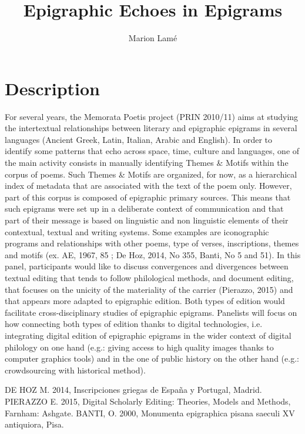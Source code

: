 \documentclass[amsthm,ebook]{saparticle}
\title{Epigraphic Echoes in Epigrams}
\author[CLUJ]{Marion Lam\'e\corref{first}}
\begin{document}
\maketitle



\section{Description}

For several years, the Memorata Poetis project (PRIN 2010/11) aims at studying the intertextual relationships between literary and epigraphic epigrams in several languages (Ancient Greek, Latin, Italian, Arabic and English). In order to identify some patterns that echo across space, time, culture and languages, one of the main activity consists in manually identifying Themes \& Motifs within the corpus of poems. Such Themes \& Motifs are organized, for now, as a hierarchical index of metadata that are associated with the text of the poem only. However, part of this corpus is composed of epigraphic primary sources. This means that such epigrams were set up in a deliberate context of communication and that part of their message is based on linguistic and non linguistic elements of their contextual, textual and writing systems. Some examples are iconographic programs and relationships with other poems, type of verses, inscriptions, themes and motifs (ex. AE, 1967, 85 ; De Hoz, 2014, No 355, Banti, No 5 and 51). In this panel, participants would like to discuss convergences and divergences between textual editing that tends to follow philological methods, and document editing, that focuses on the unicity of the materiality of the carrier (Pierazzo, 2015) and that appears more adapted to epigraphic edition. Both types of edition would facilitate cross-disciplinary studies of epigraphic epigrams. Panelists will focus on how connecting both types of edition thanks to digital technologies, i.e. integrating digital edition of epigraphic epigrams in the wider context of digital philology on one hand (e.g.: giving access to high quality images thanks to computer graphics tools) and in the one of public history on the other hand (e.g.: crowdsourcing with historical method).

DE HOZ M. 2014, Inscripciones griegas de España y Portugal, Madrid. 
PIERAZZO E. 2015, Digital Scholarly Editing: Theories, Models and Methods, Farnham: Ashgate.
BANTI, O. 2000, Monumenta epigraphica pisana saeculi XV antiquiora, Pisa.
\end{document}

